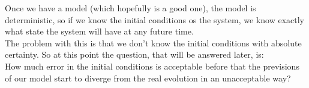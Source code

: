 Once we have a model (which hopefully is a good one), the model is deterministic, so if we know the initial conditions os the system, we know exactly what state the system will have at any future time. \\
The problem with this is that we don't know the initial conditions with absolute certainty. So at this point the question, that will be answered later, is: \\
How much error in the initial conditions is acceptable before that the previsions of our model start to diverge from the real evolution in an unacceptable way?
	












